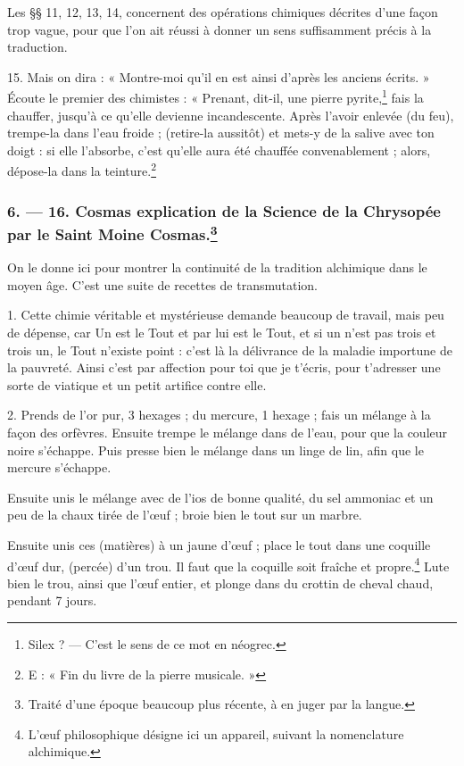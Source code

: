 \documentclass[a4paper, 11pt, oneside, polutonikogreek, french]{article}
\begin{document}
Les §§ 11, 12, 13, 14, concernent des opérations chimiques décrites d'une façon trop vague, pour que l'on ait réussi à donner un sens suffisamment précis à la traduction.

15. Mais on dira : « Montre-moi qu'il en est ainsi d'après les anciens écrits. » Écoute le premier des chimistes : « Prenant, dit-il, une pierre pyrite,\footnote{Silex ? --- C'est le sens de ce mot en néogrec.} fais la chauffer, jusqu'à ce qu'elle devienne incandescente. Après l'avoir enlevée (du feu), trempe-la dans l'eau froide ; (retire-la aussitôt) et mets-y de la salive avec ton doigt : si elle l'absorbe, c'est qu'elle aura été chauffée convenablement ; alors, dépose-la dans la teinture.\footnote{E : « Fin du livre de la pierre musicale. »}

\bigskip
\centerline{\EightStarTaper}
\centerline{\EightStarTaper\EightStarTaper}
\bigskip

\subsubsection[6. --- 16. Cosmas explication de la Science de la Chrysopée par le Saint Moine Cosmas.]{6. --- 16. Cosmas explication de la Science de la Chrysopée par le Saint Moine Cosmas.\footnote{Traité d'une époque beaucoup plus récente, à en juger par la langue.  }}

On le donne ici pour montrer la continuité de la tradition alchimique dans le moyen âge. C'est une suite de recettes de transmutation.

1. Cette chimie véritable et mystérieuse demande beaucoup de travail, mais peu de dépense, car Un est le Tout et par lui est le Tout, et si un n'est pas trois et trois un, le Tout n'existe point : c'est là la délivrance de la maladie importune de la pauvreté. Ainsi c'est par affection pour toi que je t'écris, pour t'adresser une sorte de viatique et un petit artifice contre elle.

2. Prends de l'or pur, 3 hexages ; du mercure, 1 hexage ; fais un mélange à la façon des orfèvres. Ensuite trempe le mélange dans de l'eau, pour que la couleur noire s'échappe. Puis presse bien le mélange dans un linge de lin, afin que le mercure s'échappe.

Ensuite unis le mélange avec de l'ios de bonne qualité, du sel ammoniac et un peu de la chaux tirée de l'œuf ; broie bien le tout sur un marbre.

Ensuite unis ces (matières) à un jaune d'œuf ; place le tout dans une coquille d'œuf dur, (percée) d'un trou. Il faut que la coquille soit fraîche et propre.\footnote{L'œuf philosophique désigne ici un appareil, suivant la nomenclature alchimique.} Lute bien le trou, ainsi que l'œuf entier, et plonge dans du crottin de cheval chaud, pendant 7 jours.
\end{document}

